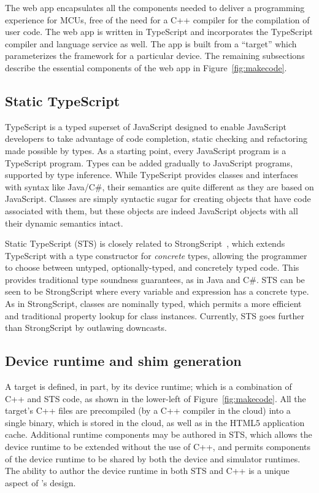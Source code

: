 The web app encapsulates all the components needed to deliver a programming experience for MCUs, free of the need for a C++ compiler for the compilation of user code. The web app is written in TypeScript and incorporates the TypeScript compiler and language service as well. The app is built from a \MC ``target'' which parameterizes the \MC framework for a particular device. The remaining subsections describe the essential components of the web app in Figure~\ref{fig:makecode}.

\subsection{Static TypeScript}

TypeScript is a typed superset of JavaScript designed to enable JavaScript developers to take advantage of code
completion, static checking and refactoring made possible by types.
As a starting point, every JavaScript program is a TypeScript program.  Types can be added gradually to
JavaScript programs, supported by type inference.
While TypeScript provides classes and interfaces with syntax like
Java/C\#, their semantics are quite different as they are based on JavaScript. Classes are simply syntactic sugar for creating objects that have code associated with them, but these objects are indeed
JavaScript objects with all their dynamic semantics intact.

Static TypeScript (STS) is closely related to Strong\-Script~\cite{StrongScriptECOOP15}, which extends TypeScript with a type constructor for \emph{concrete} types, allowing the programmer to choose between untyped, optionally-typed, and concretely typed code. This provides traditional type soundness guarantees, as in Java and C\#. STS can be seen to be StrongScript where every variable and expression has a concrete type. As in StrongScript, classes are nominally typed, which permits a more efficient and traditional property lookup for class instances. Currently, STS goes further than StrongScript by outlawing downcasts.

\subsection{Device runtime and shim generation}
\label{sec:shim-gen}

A \MC target is defined, in part, by its device runtime; which is a combination of C++ and STS code, as shown in the lower-left of Figure~\ref{fig:makecode}. All the target's C++ files are precompiled (by a C++ compiler in the cloud) into a single binary, which is stored in the cloud, as well as in the HTML5 application cache. Additional runtime components may be authored in STS, which allows the device runtime to be extended without the use of C++, and permits components of the device runtime to be shared by both the device and simulator runtimes. The ability to author the device runtime in both STS and C++ is a unique aspect of \MCN's design.

